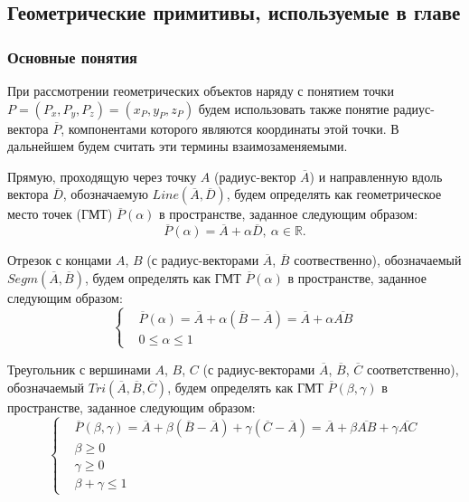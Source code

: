 \subsection{Геометрические примитивы, используемые в главе}

\subsubsection{Основные понятия}

При рассмотрении геометрических объектов наряду с понятием точки $P = (P_x, P_y, P_z) = (x_P, y_P, z_P)$ будем использовать также понятие радиус-вектора $\overline{P}$, компонентами которого являются координаты этой точки.
В дальнейшем будем считать эти термины взаимозаменяемыми.

Прямую, проходящую через точку $A$ (радиус-вектор $\overline{A}$) и направленную вдоль вектора $\overline{D}$, обозначаемую $Line(\overline{A}, \overline{D})$, будем определять как геометрическое место точек\label{term:gmt} (ГМТ\label{abbr:gmt}) $\overline{P}(\alpha)$ в пространстве, заданное следующим образом:
\begin{equation}\label{eqn:text_1_geo_prim_line}
	\overline{P}(\alpha) = \overline{A} + \alpha \overline{D}, \ \alpha \in \mathbb{R}.
\end{equation}

Отрезок с концами $A$, $B$ (с радиус-векторами $\overline{A}$, $\overline{B}$ соотвественно), обозначаемый $Segm(\overline{A}, \overline{B})$, будем определять как ГМТ $\overline{P}(\alpha)$ в пространстве, заданное следующим образом:
\begin{equation}\label{eqn:text_1_geo_prim_segment}
	\left\{
		\begin{aligned}
			& \overline{P}(\alpha) = \overline{A} + \alpha (\overline{B} - \overline{A}) = \overline{A} + \alpha \overline{AB} \\
			& 0 \le \alpha \le 1
		\end{aligned}
	\right.
\end{equation}

Треугольник с вершинами $A$, $B$, $C$ (с радиус-векторами $\overline{A}$, $\overline{B}$, $\overline{C}$ соответственно), обозначаемый $Tri(\overline{A}, \overline{B}, \overline{C})$, будем определять как ГМТ $\overline{P}(\beta, \gamma)$ в пространстве, заданное следующим образом:
\begin{equation}\label{eqn:text_1_geo_prim_triangle}
	\left\{
		\begin{aligned}
			& \overline{P}(\beta, \gamma) = \overline{A} + \beta (\overline{B} - \overline{A}) + \gamma (\overline{C} - \overline{A}) = \overline{A} + \beta \overline{AB} + \gamma \overline{AC} \\
			& \beta \ge 0 \\
			& \gamma \ge 0 \\
			& \beta + \gamma \le 1
		\end{aligned}
	\right.
\end{equation}

